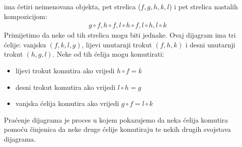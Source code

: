 \documentclass[11pt]{article}
\theoremstyle{definition}
\begin{document}
  \begin{center}
  \end{center}
  ima četiri neimenovana objekta, pet strelica ($f, g, h, k, l$) i pet
  strelica nastalih kompozicijom:
  \begin{align*}
    g \circ f, h \circ f, l \circ h \circ f, l \circ h, l \circ k
  \end{align*}
  Primijetimo da neke od tih strelica mogu biti jednake.
  Ovaj dijagram ima tri ćelije: vanjsku $(f, k, l, g)$, lijevi
  unutarnji trokut $(f, h, k)$ i desni unutarnji trokut $(h, g, l)$.
  Neke od tih ćelija mogu komutirati:
  \begin{itemize}
      \item lijevi trokut komutira ako vrijedi $h \circ f = k$
      \item desni trokut komutira ako vrijedi $l \circ h = g$
      \item vanjska ćelija komutira ako vrijedi $g \circ f = l \circ k$
  \end{itemize}
  Praćenje dijagrama je proces u kojem pokazujemo da neka ćelija komutira pomoću
  činjenica da neke druge ćelije komutiraju te nekih drugih svojstava dijagrama.
\end{document}
